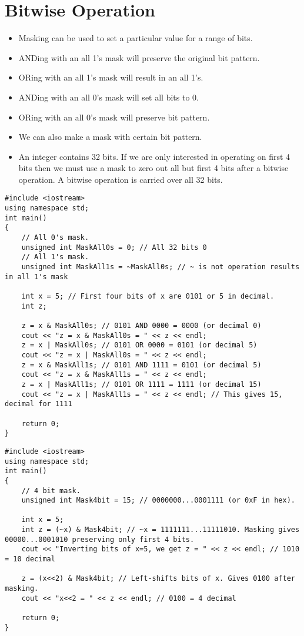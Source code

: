 \documentclass[12pt,a4paper]{article}
\begin{document}
\section{Bitwise Operation}
\begin{itemize}
\item Masking can be used to set a particular value for a range of bits.
\item ANDing with an all 1's mask will preserve the original bit pattern.
\item ORing with an all 1's mask will result in an all 1's.
\item ANDing with an all 0's mask will set all bits to 0.
\item ORing with an all 0's mask will preserve bit pattern.
\item We can also make a mask with certain bit pattern.
\item An integer contains 32 bits. If we are only interested in operating on first 4 bits then we must use a mask to zero out all but first 4 bits after a bitwise operation. A bitwise operation is carried over all 32 bits.
\end{itemize}
\label{Masking}
\begin{lstlisting}[caption={Example: Masking}]
#include <iostream> 
using namespace std; 
int main()
{
	// All 0's mask.
	unsigned int MaskAll0s = 0; // All 32 bits 0
	// All 1's mask.
	unsigned int MaskAll1s = ~MaskAll0s; // ~ is not operation results in all 1's mask
	
	int x = 5; // First four bits of x are 0101 or 5 in decimal.
	int z;
	
	z = x & MaskAll0s; // 0101 AND 0000 = 0000 (or decimal 0)
	cout << "z = x & MaskAll0s = " << z << endl;
	z = x | MaskAll0s; // 0101 OR 0000 = 0101 (or decimal 5)
	cout << "z = x | MaskAll0s = " << z << endl;
	z = x & MaskAll1s; // 0101 AND 1111 = 0101 (or decimal 5)
	cout << "z = x & MaskAll1s = " << z << endl;
	z = x | MaskAll1s; // 0101 OR 1111 = 1111 (or decimal 15)
	cout << "z = x | MaskAll1s = " << z << endl; // This gives 15, decimal for 1111

	return 0;
}
\end{lstlisting}
\begin{lstlisting}[caption={Example: Masking 4 bits}]
#include <iostream> 
using namespace std; 
int main()
{
	// 4 bit mask.
	unsigned int Mask4bit = 15; // 0000000...0001111 (or 0xF in hex).
	
	int x = 5;
	int z = (~x) & Mask4bit; // ~x = 1111111...11111010. Masking gives 00000...0001010 preserving only first 4 bits.
	cout << "Inverting bits of x=5, we get z = " << z << endl; // 1010 = 10 decimal
	
	z = (x<<2) & Mask4bit; // Left-shifts bits of x. Gives 0100 after masking.
	cout << "x<<2 = " << z << endl; // 0100 = 4 decimal
	
	return 0;
}
\end{lstlisting}
\end{document}

